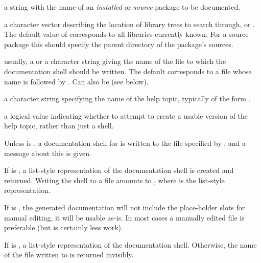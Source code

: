%
\begin{Arguments}
\begin{ldescription}
\item[\code{package}] a  string with the name of an
\emph{installed} or \emph{source} package to be documented.
\item[\code{lib.loc}] a character vector describing the location of \R{}
library trees to search through, or .  The default value
of  corresponds to all libraries currently known.  For a
source package this should specify the parent directory of the
package's sources.
\item[\code{filename}] usually, a  or a character string giving the
name of the file to which the documentation shell should be written.
The default corresponds to a file whose name is  followed
by .  Can also be  (see below).
\item[\code{name}] a character string specifying the name of the help topic,
typically of the form .
\item[\code{final}] a logical value indicating whether to attempt to
create a usable version of the help topic, rather than just a shell.
\end{ldescription}
\end{Arguments}
%
\begin{Details}\relax
Unless  is , a documentation shell for
 is written to the file specified by , and
a message about this is given.

If  is , a list-style representation of the
documentation shell is created and returned.  Writing the shell to a
file amounts to ,
where  is the list-style representation.

If  is , the generated documentation will not
include the place-holder slots for manual editing, it will be usable
as-is.  In most cases a manually edited file is preferable (but
 is certainly less work).
\end{Details}
%
\begin{Value}
If  is , a list-style representation of the
documentation shell.  Otherwise, the name of the file written to is
returned invisibly.
\end{Value}
%
\begin{SeeAlso}\relax
{}
\end{SeeAlso}

